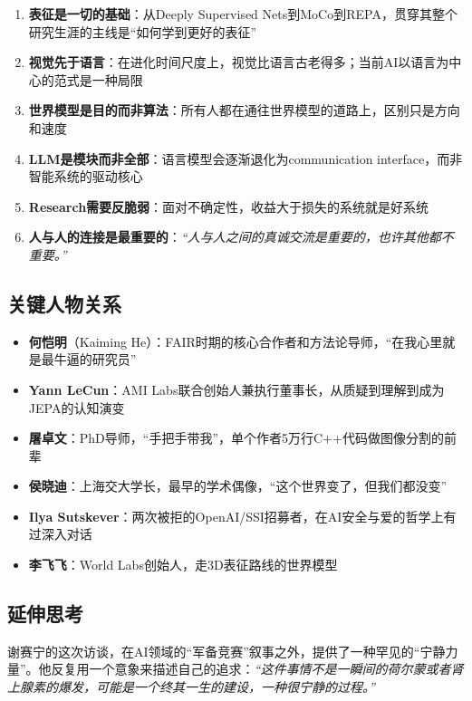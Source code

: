 \documentclass[a4paper]{article}
\begin{document}
\begin{enumerate}
    \item \textbf{表征是一切的基础}：从Deeply Supervised Nets到MoCo到REPA，贯穿其整个研究生涯的主线是``如何学到更好的表征''
    \item \textbf{视觉先于语言}：在进化时间尺度上，视觉比语言古老得多；当前AI以语言为中心的范式是一种局限
    \item \textbf{世界模型是目的而非算法}：所有人都在通往世界模型的道路上，区别只是方向和速度
    \item \textbf{LLM是模块而非全部}：语言模型会逐渐退化为communication interface，而非智能系统的驱动核心
    \item \textbf{Research需要反脆弱}：面对不确定性，收益大于损失的系统就是好系统
    \item \textbf{人与人的连接是最重要的}：\textit{``人与人之间的真诚交流是重要的，也许其他都不重要。''}
\end{enumerate}

\subsection{关键人物关系}

\begin{itemize}
    \item \textbf{何恺明}（Kaiming He）：FAIR时期的核心合作者和方法论导师，``在我心里就是最牛逼的研究员''
    \item \textbf{Yann LeCun}：AMI Labs联合创始人兼执行董事长，从质疑到理解到成为JEPA的认知演变
    \item \textbf{屠卓文}：PhD导师，``手把手带我''，单个作者5万行C++代码做图像分割的前辈
    \item \textbf{侯晓迪}：上海交大学长，最早的学术偶像，``这个世界变了，但我们都没变''
    \item \textbf{Ilya Sutskever}：两次被拒的OpenAI/SSI招募者，在AI安全与爱的哲学上有过深入对话
    \item \textbf{李飞飞}：World Labs创始人，走3D表征路线的世界模型
\end{itemize}

\subsection{延伸思考}

谢赛宁的这次访谈，在AI领域的``军备竞赛''叙事之外，提供了一种罕见的``宁静力量''。他反复用一个意象来描述自己的追求：\textit{``这件事情不是一瞬间的荷尔蒙或者肾上腺素的爆发，可能是一个终其一生的建设，一种很宁静的过程。''}
\end{document}

